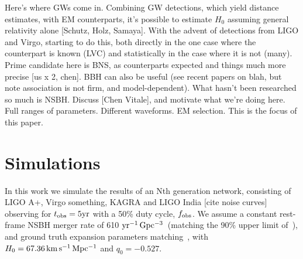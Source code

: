 \documentclass[twocolumn]{aastex63}
\newcommand{\hubble}{\ensuremath{H_0}}
\newcommand{\decel}{\ensuremath{q_0}}
\newcommand{\tobs}{t_{\rm obs}}
\newcommand{\fobs}{f_{\rm obs}}
\newcommand{\kmsmpc}{\ensuremath{{\rm km\,s^{-1}\,Mpc^{-1}}}}
\newcommand{\yr}{\ensuremath{{\rm yr}}}
\newcommand{\yrgpc}{\ensuremath{{\rm yr^{-1}\,Gpc^{-3}}}}
\begin{document}
Here's where GWs come in. Combining GW detections, which yield distance estimates, with EM counterparts, it's possible to estimate $H_0$ assuming general relativity alone [Schutz, Holz, Samaya]. With the advent of detections from LIGO and Virgo, starting to do this, both directly in the one case where the counterpart is known (LVC) and statistically in the case where it is not (many). Prime candidate here is BNS, as counterparts expected and things much more precise [us x 2, chen]. BBH can also be useful (see recent papers on blah, but note association is not firm, and model-dependent). What hasn't been researched so much is NSBH. Discuss [Chen Vitale], and motivate what we're doing here. Full ranges of parameters. Different waveforms. EM selection. This is the focus of this paper.


\section{Simulations} \label{sec:sims}

In this work we simulate the results of an Nth generation network, consisting of LIGO A+, Virgo something, KAGRA and LIGO India [cite noise curves] observing for $\tobs = 5 \yr$ with a 50\% duty cycle, $\fobs$. We assume a constant rest-frame  NSBH merger rate of 610 \yrgpc\ (matching the 90\% upper limit of~\cite{Ligo:2018}), and ground truth expansion parameters matching~\cite{Planck_VI:2018}, with $\hubble=67.36\,\kmsmpc$ and $\decel=-0.527$.
\end{document}
